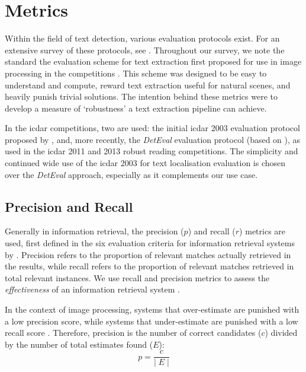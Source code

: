 \section{Metrics}
\label{sec:background:metrics}

Within the field of text detection, various evaluation protocols exist. For an extensive survey of these protocols, see \citep{Wolf:2006gv,Ye:2014bs}. Throughout our survey, we note the standard the evaluation scheme for text extraction first proposed for use in image processing in the  competitions \citep{Lucas:2003iw, Lucas:2005bq, Shahab:2011hq, Karatzas:2013by, Karatzas:2015tj}. This scheme was designed to be easy to understand and compute, reward text extraction useful for natural scenes, and heavily punish trivial solutions. The intention behind these metrics were to develop a measure of `robustness' a text extraction pipeline can achieve. 

In the \gls{icdar} competitions, two are used: the initial \gls{icdar} 2003 evaluation protocol proposed by \citet{Lucas:2003iw}, and, more recently, the \textit{DetEval} evaluation protocol \citep{Shivakumara:2011dn} (based on \citep{Wolf:2006gv}), as used in the \gls{icdar} 2011 and 2013 robust reading competitions. The simplicity and continued wide use of the \gls{icdar} 2003 for text localisation evaluation is chosen over the \textit{DetEval} approach, especially as it complements our use case.

\subsection{Precision and Recall}
\label{sec:background:metrics:precision_and_recall}

Generally in information retrieval, the precision ($p$) and recall ($r$) metrics are used, first defined in the six evaluation criteria for information retrieval systems by \citet{Cleverdon:1966vd}. Precision refers to the proportion of relevant matches actually retrieved in the results, while recall refers to the proportion of relevant matches retrieved in total relevant instances. We use recall and precision metrics to assess the \textit{effectiveness} of an information retrieval system \citep{Rijsbergen:1979dw}.

In the context of image processing, systems that over-estimate are punished with a low precision score, while systems that under-estimate are punished with a low recall score \citep{Lucas:2003iw}. Therefore, precision is the number of correct candidates ($c$) divided by the number of total estimates found ($E$):
\begin{equation*}
  p = \frac{c}{\lvert\;E\;\rvert}
\end{equation*}

